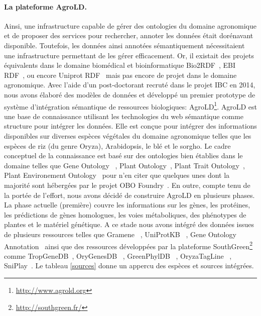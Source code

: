 \paragraph*{La plateforme AgroLD.} Ainsi, une infrastructure capable de gérer des ontologies du domaine agronomique et de proposer des services pour rechercher, annoter les données était dorénavant disponible. Toutefois, les données ainsi annotées sémantiquement nécessitaient une infrastructure permettant de les gérer efficacement. Or, il existait des projets équivalents dans le domaine biomédical et bioinformatique Bio2RDF~\cite{Belleau2008a,Callahan2013}, EBI RDF~\cite{Jupp2014}, ou encore Uniprot RDF~\cite{redaschi2009}  mais pas encore de projet dans le domaine agronomique. Avec l’aide d’un post-doctorant recruté dans le projet IBC en 2014, nous avons élaboré des modèles de données et développé un premier prototype de système d’intégration sémantique de ressources biologiques: AgroLD\footnote{\url{http://www.agrold.org}}. AgroLD est une base de connaissance utilisant les technologies du web sémantique comme structure pour intégrer les données. Elle est conçue pour intégrer des informations disponibles sur diverses espèces végétales du domaine agronomique telles que les espèces de riz (du genre Oryza), Arabidopsis, le blé et le sorgho. Le cadre conceptuel de la connaissance est basé sur des ontologies bien établies dans le domaine telles que Gene Ontology ~\cite{Ashburner2000,TheGeneOntologyConsortium2014}, Plant Ontology~\cite{plantOntology2002}, Plant Trait Ontology~\cite{planteome2018}, Plant Environement Ontology~\cite{envo2016} pour n'en citer que quelques unes dont la majorité sont hébergées par le projet OBO Foundry~\cite{Smith2007}. En outre, compte tenu de la portée de l'effort, nous avons décidé de construire AgroLD en plusieurs phases. La phase actuelle (première) couvre les informations sur les gènes, les protéines, les prédictions de gènes homologues, les voies métaboliques, des phénotypes de plantes et le matériel génétique. A ce stade nous avons intégré des données issues de plusieurs ressources telles que Gramene~\cite{gramene2018} , UniProtKB~\cite{uniprot2011} , Gene Ontology Annotation~\cite{goa2009}  ainsi que des ressources développées par la plateforme SouthGreen\footnote{\url{http://southgreen.fr/}} comme TropGeneDB~\cite{tropgenedb2012}, OryGenesDB~\cite{Droc2009b} , GreenPhylDB~\cite{greenphyl2011} , OryzaTagLine~\cite{larmande2008} , SniPlay~\cite{sniplay3}.  Le tableau \ref{sources} donne un appercu des espèces et sources intégrées.\\

